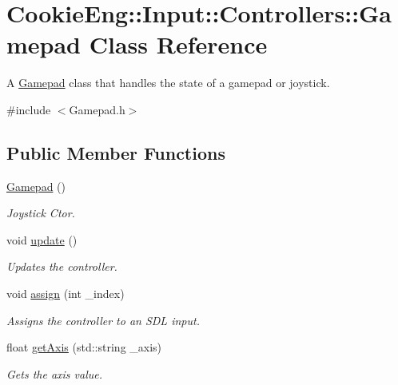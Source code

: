 \hypertarget{class_cookie_eng_1_1_input_1_1_controllers_1_1_gamepad}{}\section{Cookie\+Eng\+:\+:Input\+:\+:Controllers\+:\+:Gamepad Class Reference}
\label{class_cookie_eng_1_1_input_1_1_controllers_1_1_gamepad}


A \hyperlink{class_cookie_eng_1_1_input_1_1_controllers_1_1_gamepad}{Gamepad} class that handles the state of a gamepad or joystick.  




{\ttfamily \#include $<$Gamepad.\+h$>$}

\subsection*{Public Member Functions}
\begin{DoxyCompactItemize}
\item 
\hyperlink{class_cookie_eng_1_1_input_1_1_controllers_1_1_gamepad_add93a6a7e241106275f499411892a193}{Gamepad} ()
\begin{DoxyCompactList}\small\item\em Joystick Ctor. \end{DoxyCompactList}\item 
void \hyperlink{class_cookie_eng_1_1_input_1_1_controllers_1_1_gamepad_a9e0bb49c66f1bac8111159e5a39809e2}{update} ()
\begin{DoxyCompactList}\small\item\em Updates the controller. \end{DoxyCompactList}\item 
void \hyperlink{class_cookie_eng_1_1_input_1_1_controllers_1_1_gamepad_a82943bb75408298ac2f80e8f8d4a84b2}{assign} (int \+\_\+index)
\begin{DoxyCompactList}\small\item\em Assigns the controller to an S\+DL input. \end{DoxyCompactList}\item 
float \hyperlink{class_cookie_eng_1_1_input_1_1_controllers_1_1_gamepad_a5fde889f1054c3dbd25d5694b26f5c2e}{get\+Axis} (std\+::string \+\_\+axis)
\begin{DoxyCompactList}\small\item\em Gets the axis value. \end{DoxyCompactList}\end{DoxyCompactItemize}
